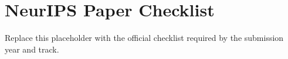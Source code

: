 \section*{NeurIPS Paper Checklist}

Replace this placeholder with the official checklist required by the submission year and track.
